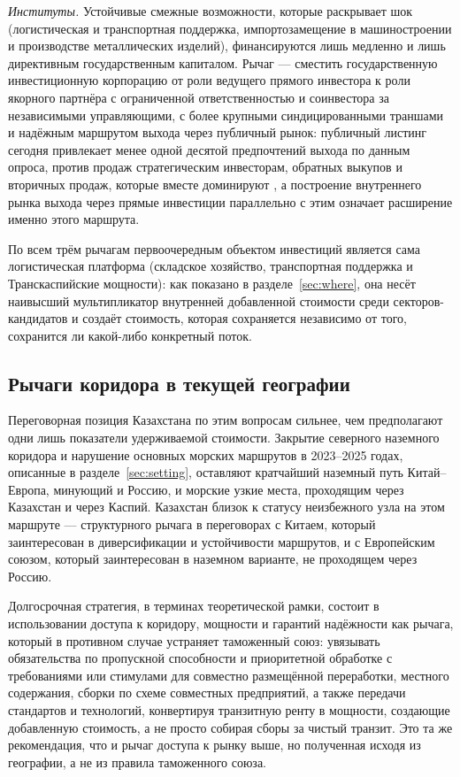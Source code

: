 \documentclass[12pt]{article}
\begin{document}
\emph{Институты.} Устойчивые смежные возможности, которые раскрывает шок (логистическая и
транспортная поддержка, импортозамещение в машиностроении и производстве металлических
изделий), финансируются лишь медленно и лишь директивным государственным капиталом. Рычаг
— сместить государственную инвестиционную корпорацию от роли ведущего прямого инвестора к
роли якорного партнёра с ограниченной ответственностью и соинвестора за независимыми
управляющими, с более крупными синдицированными траншами и надёжным маршрутом выхода через
публичный рынок: публичный листинг сегодня привлекает менее одной десятой предпочтений
выхода по данным опроса, против продаж стратегическим инвесторам, обратных выкупов и
вторичных продаж, которые вместе доминируют \citep{qicaifcifc2026pe}, а построение
внутреннего рынка выхода через прямые инвестиции параллельно с этим означает расширение
именно этого маршрута.

По всем трём рычагам первоочередным объектом инвестиций является сама логистическая
платформа (складское хозяйство, транспортная поддержка и Транскаспийские мощности): как
показано в разделе~\ref{sec:where}, она несёт наивысший мультипликатор внутренней
добавленной стоимости среди секторов-кандидатов и создаёт стоимость, которая сохраняется
независимо от того, сохранится ли какой-либо конкретный поток.

\subsection{Рычаги коридора в текущей географии}

Переговорная позиция Казахстана по этим вопросам сильнее, чем предполагают одни лишь
показатели удерживаемой стоимости. Закрытие северного наземного коридора и нарушение
основных морских маршрутов в 2023--2025 годах, описанные в разделе~\ref{sec:setting},
оставляют кратчайший наземный путь Китай--Европа, минующий и Россию, и морские узкие места,
проходящим через Казахстан и через Каспий. Казахстан близок к статусу неизбежного узла на
этом маршруте — структурного рычага в переговорах с Китаем, который заинтересован в
диверсификации и устойчивости маршрутов, и с Европейским союзом, который заинтересован в
наземном варианте, не проходящем через Россию.

Долгосрочная стратегия, в терминах теоретической рамки, состоит в использовании доступа к
коридору, мощности и гарантий надёжности как рычага, который в противном случае устраняет
таможенный союз: увязывать обязательства по пропускной способности и приоритетной обработке
с требованиями или стимулами для совместно размещённой переработки, местного содержания,
сборки по схеме совместных предприятий, а также передачи стандартов и технологий,
конвертируя транзитную ренту в мощности, создающие добавленную стоимость, а не просто
собирая сборы за чистый транзит. Это та же рекомендация, что и рычаг доступа к рынку выше,
но полученная исходя из географии, а не из правила таможенного союза.
\end{document}
